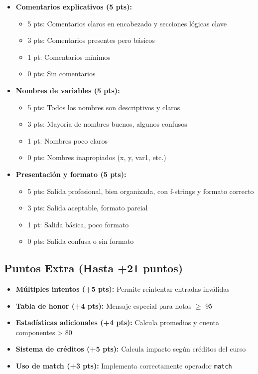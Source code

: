 \documentclass[12pt,a4paper]{article}
\begin{document}
\begin{itemize}[leftmargin=*]
    \item \textbf{Comentarios explicativos (5 pts):}
    \begin{itemize}
        \item 5 pts: Comentarios claros en encabezado y secciones lógicas clave
        \item 3 pts: Comentarios presentes pero básicos
        \item 1 pt: Comentarios mínimos
        \item 0 pts: Sin comentarios
    \end{itemize}
    
    \item \textbf{Nombres de variables (5 pts):}
    \begin{itemize}
        \item 5 pts: Todos los nombres son descriptivos y claros
        \item 3 pts: Mayoría de nombres buenos, algunos confusos
        \item 1 pt: Nombres poco claros
        \item 0 pts: Nombres inapropiados (x, y, var1, etc.)
    \end{itemize}
    
    \item \textbf{Presentación y formato (5 pts):}
    \begin{itemize}
        \item 5 pts: Salida profesional, bien organizada, con f-strings y formato correcto
        \item 3 pts: Salida aceptable, formato parcial
        \item 1 pt: Salida básica, poco formato
        \item 0 pts: Salida confusa o sin formato
    \end{itemize}
\end{itemize}

\subsection{Puntos Extra (Hasta +21 puntos)}

\begin{itemize}[leftmargin=*]
    \item \textbf{Múltiples intentos (+5 pts):} Permite reintentar entradas inválidas
    \item \textbf{Tabla de honor (+4 pts):} Mensaje especial para notas $\geq$ 95
    \item \textbf{Estadísticas adicionales (+4 pts):} Calcula promedios y cuenta componentes > 80
    \item \textbf{Sistema de créditos (+5 pts):} Calcula impacto según créditos del curso
    \item \textbf{Uso de match (+3 pts):} Implementa correctamente operador \texttt{match}
\end{itemize}
\end{document}
